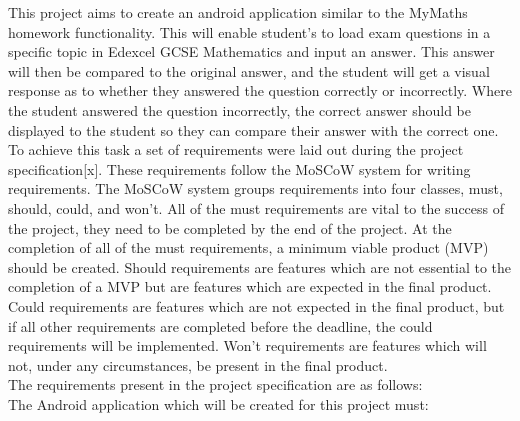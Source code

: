 \documentclass{article}
\begin{document}
This project aims to create an android application similar to the MyMaths homework functionality. This will enable student's to load exam questions in a specific topic in Edexcel GCSE Mathematics and input an answer. This answer will then be compared to the original answer, and the student will get a visual response as to whether they answered the question correctly or incorrectly. Where the student answered the question incorrectly, the correct answer should be displayed to the student so they can compare their answer with the correct one. \\

To achieve this task a set of requirements were laid out during the project specification[x]. These requirements follow the MoSCoW system for writing requirements. The MoSCoW system groups requirements into four classes, must, should, could, and won't. All of the must requirements are vital to the success of the project, they need to be completed by the end of the project. At the completion of all of the must requirements, a minimum viable product (MVP) should be created. Should requirements are features which are not essential to the completion of a MVP but are features which are expected in the final product. Could requirements are features which are not expected in the final product, but if all other requirements are completed before the deadline, the could requirements will be implemented. Won't requirements are features which will not, under any circumstances, be present in the final product. \\

The requirements present in the project specification are as follows: \\

The Android application which will be created for this project must: 
\end{document}
